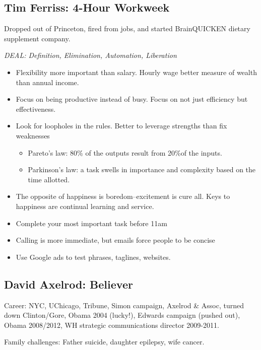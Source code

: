 \documentclass[
]{article}
\begin{document}
\hypertarget{tim-ferriss-4-hour-workweek}{%
\subsection{Tim Ferriss: 4-Hour
Workweek}\label{tim-ferriss-4-hour-workweek}}

Dropped out of Princeton, fired from jobs, and started BrainQUICKEN
dietary supplement company.

\emph{DEAL: Definition, Elimination, Automation, Liberation}

\begin{itemize}
\item
  Flexibility more important than salary. Hourly wage better measure of
  wealth than annual income.
\item
  Focus on being productive instead of busy. Focus on not just
  efficiency but effectiveness.
\item
  Look for loopholes in the rules. Better to leverage strengths than fix
  weaknesses

  \begin{itemize}
  \item
    Pareto's law: 80\% of the outputs result from 20\%of the inputs.
  \item
    Parkinson's law: a task swells in importance and complexity based on
    the time allotted.
  \end{itemize}
\item
  The opposite of happiness is boredom--excitement is cure all. Keys to
  happiness are continual learning and service.
\item
  Complete your most important task before 11am
\item
  Calling is more immediate, but emails force people to be concise
\item
  Use Google ads to test phrases, taglines, websites.
\end{itemize}

\hypertarget{david-axelrod-believer}{%
\subsection{David Axelrod: Believer}\label{david-axelrod-believer}}

Career: NYC, UChicago, Tribune, Simon campaign, Axelrod \& Assoc, turned
down Clinton/Gore, Obama 2004 (lucky!), Edwards campaign (pushed out),
Obama 2008/2012, WH strategic communications director 2009-2011.

Family challenges: Father suicide, daughter epilepsy, wife cancer.
\end{document}
